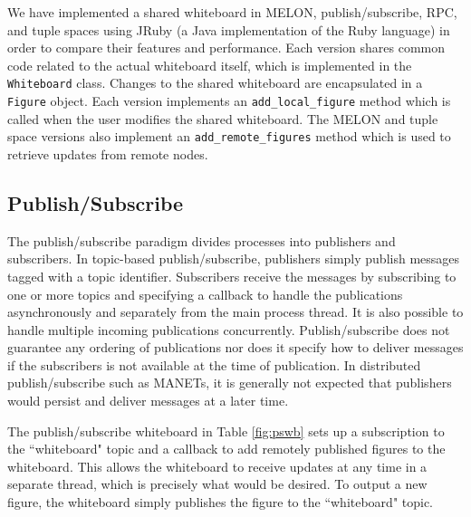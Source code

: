 We have implemented a shared whiteboard in MELON, publish/subscribe, RPC, and tuple spaces using JRuby (a Java implementation of the Ruby language) in order to compare their features and performance.
Each version shares common code related to the actual whiteboard itself, which is implemented in the \texttt{Whiteboard} class.
Changes to the shared whiteboard are encapsulated in a \texttt{Figure} object. Each version implements an \texttt{add\_local\_figure} method which is called when the user modifies the shared whiteboard.
The MELON and tuple space versions also implement an \texttt{add\_remote\_figures} method which is used to retrieve updates from remote nodes.

\subsection{Publish/Subscribe}

The publish/subscribe paradigm divides processes into publishers and subscribers. In topic-based publish/subscribe, publishers simply publish messages tagged with a topic identifier. Subscribers receive the messages by subscribing to one or more topics and specifying a callback to handle the publications asynchronously and separately from the main process thread. It is also possible to handle multiple incoming publications concurrently. Publish/subscribe does not guarantee any ordering of publications nor does it specify how to deliver messages if the subscribers is not available at the time of publication. In distributed publish/subscribe such as MANETs, it is generally not expected that publishers would persist and deliver messages at a later time\cite{psfaces}.

The publish/subscribe whiteboard in Table \ref{fig:pswb} sets up a subscription to the ``whiteboard" topic and a callback to add remotely published figures to the whiteboard. This allows the whiteboard to receive updates at any time in a separate thread, which is precisely what would be desired. To output a new figure, the whiteboard simply publishes the figure to the ``whiteboard" topic.

